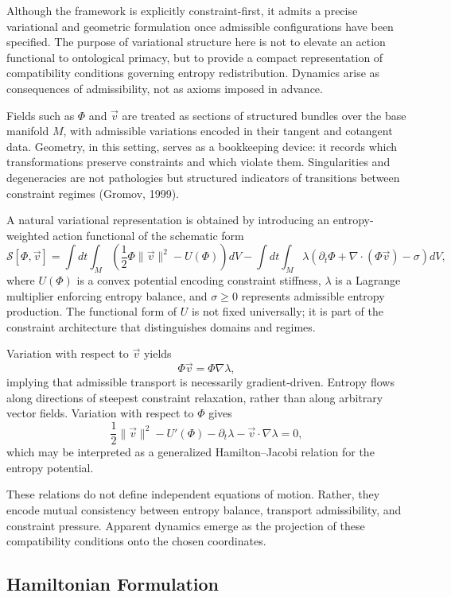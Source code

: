 \documentclass[11pt]{article}
\begin{document}
Although the framework is explicitly constraint-first, it admits a precise variational and geometric formulation once admissible configurations have been specified. The purpose of variational structure here is not to elevate an action functional to ontological primacy, but to provide a compact representation of compatibility conditions governing entropy redistribution. Dynamics arise as consequences of admissibility, not as axioms imposed in advance.

Fields such as $\Phi$ and $\vec{v}$ are treated as sections of structured bundles over the base manifold $M$, with admissible variations encoded in their tangent and cotangent data. Geometry, in this setting, serves as a bookkeeping device: it records which transformations preserve constraints and which violate them. Singularities and degeneracies are not pathologies but structured indicators of transitions between constraint regimes (Gromov, 1999).

A natural variational representation is obtained by introducing an entropy-weighted action functional of the schematic form
\[
\mathcal{S}[\Phi,\vec{v}]
=
\int dt \int_M
\left(
\frac{1}{2} \Phi \lVert \vec{v} \rVert^2
-
U(\Phi)
\right) dV
-
\int dt \int_M
\lambda \left(
\partial_t \Phi + \nabla \cdot (\Phi \vec{v}) - \sigma
\right) dV,
\]
where $U(\Phi)$ is a convex potential encoding constraint stiffness, $\lambda$ is a Lagrange multiplier enforcing entropy balance, and $\sigma \ge 0$ represents admissible entropy production. The functional form of $U$ is not fixed universally; it is part of the constraint architecture that distinguishes domains and regimes.

Variation with respect to $\vec{v}$ yields
\[
\Phi \vec{v} = \Phi \nabla \lambda,
\]
implying that admissible transport is necessarily gradient-driven. Entropy flows along directions of steepest constraint relaxation, rather than along arbitrary vector fields. Variation with respect to $\Phi$ gives
\[
\frac{1}{2} \lVert \vec{v} \rVert^2
-
U'(\Phi)
-
\partial_t \lambda
-
\vec{v} \cdot \nabla \lambda
=
0,
\]
which may be interpreted as a generalized Hamilton--Jacobi relation for the entropy potential.

These relations do not define independent equations of motion. Rather, they encode mutual consistency between entropy balance, transport admissibility, and constraint pressure. Apparent dynamics emerge as the projection of these compatibility conditions onto the chosen coordinates.

\subsection*{Hamiltonian Formulation}
\end{document}
